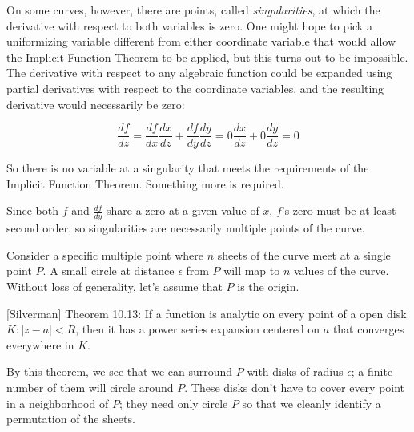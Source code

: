 
On some curves, however, there are points, called {\it singularities},
at which the derivative with respect to both variables is zero.
One might hope to pick a uniformizing variable different
from either coordinate variable that would allow the Implicit Function Theorem
to be applied, but this turns out to be impossible.  The
derivative with respect to any algebraic function could
be expanded using partial derivatives with respect to
the coordinate variables, and the resulting derivative
would necessarily be zero:

$$\frac{df}{dz} = \frac{df}{dx}\frac{dx}{dz} + \frac{df}{dy}\frac{dy}{dz} = 0\frac{dx}{dz} + 0\frac{dy}{dz} = 0$$

So there is no variable at a singularity that meets the requirements
of the Implicit Function Theorem.  Something more is required.

Since both $f$ and $\frac{df}{dy}$ share a zero at
a given value of $x$, $f$'s zero must be at least
second order, so singularities are necessarily
multiple points of the curve.


Consider a specific multiple point where $n$ sheets of the curve meet
at a single point $P$.  A small circle at distance $\epsilon$ from $P$
will map to $n$ values of the curve.  Without loss of generality,
let's assume that $P$ is the origin.

[Silverman] Theorem 10.13: If a function is analytic on every point of
a open disk $K: |z-a| < R$, then it has a power series expansion
centered on $a$ that converges everywhere in $K$.

By this theorem, we see that we can surround $P$ with disks of radius
$\epsilon$; a finite number of them will circle around $P$.  These
disks don't have to cover every point in a neighborhood of $P$; they
need only circle $P$ so that we cleanly identify a permutation
of the sheets.


